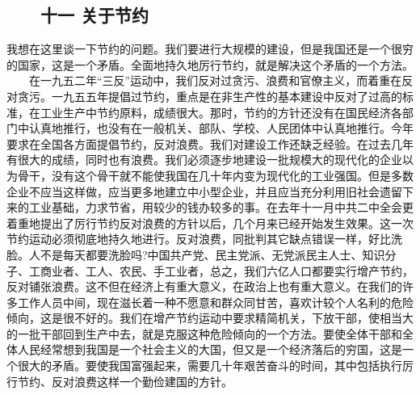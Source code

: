 \documentclass[cn,11pt,chinese]{elegantbook}
\def\myformat#1{\hfil\hfil #1}
\begin{document}
\subsection*{\myformat{　　十一 关于节约}}
我想在这里谈一下节约的问题。我们要进行大规模的建设，但是我国还是一个很穷的国家，这是一个矛盾。全面地持久地厉行节约，就是解决这个矛盾的一个方法。\\
　　在一九五二年“三反”运动中，我们反对过贪污、浪费和官僚主义，而着重在反对贪污。一九五五年提倡过节约，重点是在非生产性的基本建设中反对了过高的标准，在工业生产中节约原料，成绩很大。那时，节约的方针还没有在国民经济各部门中认真地推行，也没有在一般机关、部队、学校、人民团体中认真地推行。今年要求在全国各方面提倡节约，反对浪费。我们对建设工作还缺乏经验。在过去几年有很大的成绩，同时也有浪费。我们必须逐步地建设一批规模大的现代化的企业以为骨干，没有这个骨干就不能使我国在几十年内变为现代化的工业强国。但是多数企业不应当这样做，应当更多地建立中小型企业，并且应当充分利用旧社会遗留下来的工业基础，力求节省，用较少的钱办较多的事。在去年十一月中共二中全会更着重地提出了厉行节约反对浪费的方针以后，几个月来已经开始发生效果。这一次节约运动必须彻底地持久地进行。反对浪费，同批判其它缺点错误一样，好比洗脸。人不是每天都要洗脸吗?中国共产党、民主党派、无党派民主人士、知识分子、工商业者、工人、农民、手工业者，总之，我们六亿人口都要实行增产节约，反对铺张浪费。这不但在经济上有重大意义，在政治上也有重大意义。在我们的许多工作人员中间，现在滋长着一种不愿意和群众同甘苦，喜欢计较个人名利的危险倾向，这是很不好的。我们在增产节约运动中要求精简机关，下放干部，使相当大的一批干部回到生产中去，就是克服这种危险倾向的一个方法。要使全体干部和全体人民经常想到我国是一个社会主义的大国，但又是一个经济落后的穷国，这是一个很大的矛盾。要使我国富强起来，需要几十年艰苦奋斗的时间，其中包括执行厉行节约、反对浪费这样一个勤俭建国的方针。\\
\end{document}

